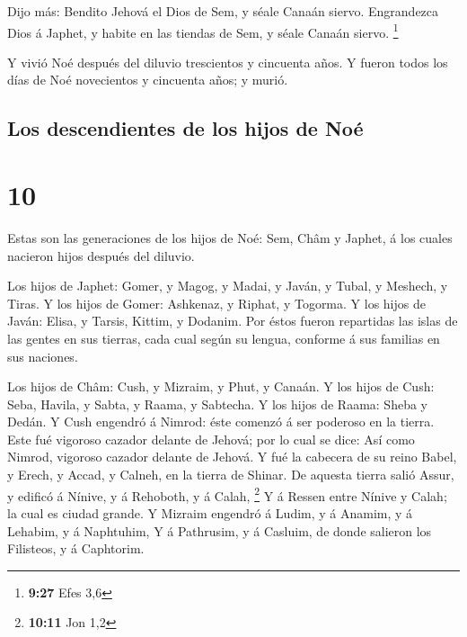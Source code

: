  Dijo más: Bendito Jehová el Dios de Sem, y séale Canaán
siervo.  Engrandezca Dios á Japhet, y habite en las
tiendas de Sem, y séale Canaán siervo. \footnote{\textbf{9:27} Efes 3,6}

 Y vivió Noé después del diluvio trescientos y cincuenta
años.  Y fueron todos los días de Noé novecientos y
cincuenta años; y murió.

\hypertarget{los-descendientes-de-los-hijos-de-nouxe9}{%
\subsection{Los descendientes de los hijos de
Noé}\label{los-descendientes-de-los-hijos-de-nouxe9}}

\hypertarget{section-9}{%
\section{10}\label{section-9}}

 Estas son las generaciones de los hijos de Noé: Sem, Châm
y Japhet, á los cuales nacieron hijos después del diluvio.

 Los hijos de Japhet: Gomer, y Magog, y Madai, y Javán, y
Tubal, y Meshech, y Tiras.  Y los hijos de Gomer:
Ashkenaz, y Riphat, y Togorma.  Y los hijos de Javán:
Elisa, y Tarsis, Kittim, y Dodanim.  Por éstos fueron
repartidas las islas de las gentes en sus tierras, cada cual según su
lengua, conforme á sus familias en sus naciones.

 Los hijos de Châm: Cush, y Mizraim, y Phut, y Canaán.
 Y los hijos de Cush: Seba, Havila, y Sabta, y Raama, y
Sabtecha. Y los hijos de Raama: Sheba y Dedán.  Y Cush
engendró á Nimrod: éste comenzó á ser poderoso en la tierra.
 Este fué vigoroso cazador delante de Jehová; por lo cual
se dice: Así como Nimrod, vigoroso cazador delante de Jehová.
 Y fué la cabecera de su reino Babel, y Erech, y Accad, y
Calneh, en la tierra de Shinar.  De aquesta tierra salió
Assur, y edificó á Nínive, y á Rehoboth, y á Calah, \footnote{\textbf{10:11}
  Jon 1,2}  Y á Ressen entre Nínive y Calah; la cual es
ciudad grande.  Y Mizraim engendró á Ludim, y á Anamim, y
á Lehabim, y á Naphtuhim,  Y á Pathrusim, y á Casluim, de
donde salieron los Filisteos, y á Caphtorim.

